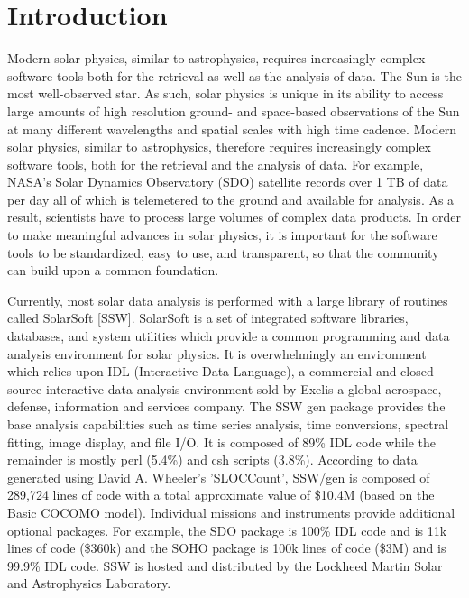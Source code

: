 \section{Introduction}
Modern solar physics, similar to astrophysics, requires increasingly complex 
software tools both for the retrieval as well as the analysis of data. The Sun 
is the most well-observed star. As such, solar physics is unique in its ability 
to access large amounts of high resolution ground- and space-based observations 
of the Sun at many different wavelengths and spatial scales with high time 
cadence. Modern solar physics, similar to astrophysics, therefore requires 
increasingly complex software tools, both for the retrieval and the analysis of 
data. For example, NASA's Solar Dynamics Observatory (SDO) satellite records 
over 1 TB of data per day all of which is telemetered to the ground and 
available for analysis. As a result, scientists have to process large volumes 
of complex data products. In order to make meaningful advances in solar 
physics, it is important for the software tools to be standardized, easy to 
use, and transparent, so that the community can build upon a common foundation.

Currently, most solar data analysis is performed with a large library of 
routines called SolarSoft [SSW]. SolarSoft is a set of integrated software 
libraries, databases, and system utilities which provide a common programming 
and data analysis environment for solar physics. It is overwhelmingly an 
environment which relies upon IDL (Interactive Data Language), a commercial and 
closed-source interactive data analysis environment sold by Exelis a global 
aerospace, defense, information and services company. The SSW gen package
provides the base analysis capabilities such as time series analysis, time 
conversions, spectral fitting, image display, and file I/O. It is composed of 
89\% IDL code while the remainder is mostly perl (5.4\%) and csh scripts 
(3.8\%). According to data generated using David A. Wheeler's 'SLOCCount', 
SSW/gen is composed of 289,724 lines of code with a total approximate value of 
\$10.4M (based on the Basic COCOMO model). Individual missions and instruments 
provide additional optional packages. For example, the SDO package is 100\% IDL 
code and is 11k lines of code (\$360k) and the SOHO package is 100k lines of 
code (\$3M) and is 99.9\% IDL code. SSW is hosted and distributed by the 
Lockheed Martin Solar and Astrophysics Laboratory.


